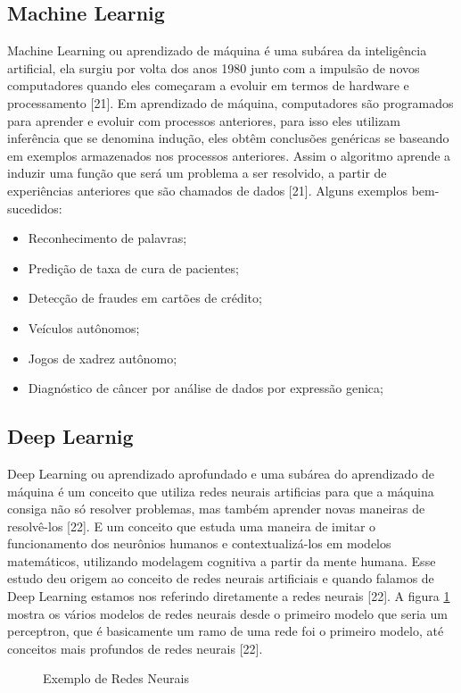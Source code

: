 \subsection{Machine Learnig}
Machine Learning ou aprendizado de máquina é uma subárea da inteligência artificial, ela surgiu por volta dos anos 1980 junto com a impulsão de novos computadores quando eles começaram a evoluir em termos de hardware e processamento [21]. Em aprendizado de máquina, computadores são programados para aprender e evoluir com processos anteriores, para isso eles utilizam inferência que se denomina indução, eles obtêm conclusões genéricas se baseando em exemplos armazenados nos processos anteriores. Assim o algoritmo aprende a induzir uma função que será um problema a ser resolvido, a partir de experiências anteriores que são chamados de dados [21]. Alguns exemplos bem-sucedidos:
\begin{itemize}
    \item Reconhecimento de palavras;
    \item Predição de taxa de cura de pacientes;
    \item Detecção de fraudes em cartões de crédito;
    \item Veículos autônomos;
    \item Jogos de xadrez autônomo;
    \item Diagnóstico de câncer por análise de dados por expressão genica;
\end{itemize}
\subsection{Deep Learnig}
Deep Learning ou aprendizado aprofundado e uma subárea do aprendizado de máquina é um conceito que utiliza redes neurais artificias para que a máquina consiga não só resolver problemas, mas também aprender novas maneiras de resolvê-los [22].  E um conceito que estuda uma maneira de imitar o funcionamento dos neurônios humanos e contextualizá-los em modelos matemáticos, utilizando modelagem cognitiva a partir da mente humana. Esse estudo deu origem ao conceito de redes neurais artificiais e quando falamos de Deep Learning estamos nos referindo diretamente a redes neurais [22].
A figura \ref{fig:exRedeNeural} mostra os vários modelos de redes neurais desde o primeiro modelo que seria um perceptron, que é basicamente um ramo de uma rede foi o primeiro modelo, até conceitos mais profundos de redes neurais [22].

%
\begin{figure}[H]
	\centering
	\caption{Exemplo de Redes Neurais}
	\def\svgwidth{14cm}
	
	\label{fig:exRedeNeural}
\end{figure}

